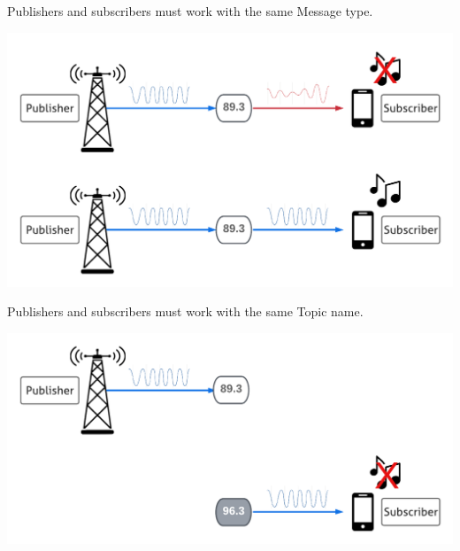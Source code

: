 \documentclass[usenames,11,dvipsnames,svgnames,x11names,aspectratio=1610,bibref]{beamer}
\renewcommand\sec{{\cnordSix{\secname}\hfill\mydisclaimer} }
\begin{document}
\begin{frame}[fragile]{\sec}
\vspace*{\fill}
\begin{center} 
Publishers and subscribers must work with the same Message type.

\includegraphics[width=.7\linewidth]{figures/lecture2/analogy2.pdf}

\end{center}
\vspace*{\fill}
\end{frame}


\begin{frame}[fragile]{\sec}
\vspace*{\fill}
\begin{center} 
Publishers and subscribers must work with the same Topic name.

\includegraphics[width=.7\linewidth]{figures/lecture2/analogy3.pdf}

\end{center}
\vspace*{\fill}
\end{frame}
\end{document}
